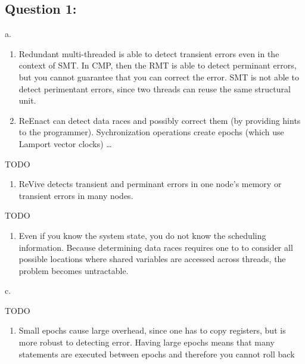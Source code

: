 \subsection{Question 1:}

a.

\begin{enumerate}
\def\labelenumi{\arabic{enumi}.}
\item
  Redundant multi-threaded is able to detect transient errors even in
  the context of SMT. In CMP, then the RMT is able to detect perminant
  errors, but you cannot guarantee that you can correct the error. SMT
  is not able to detect perimentant errors, since two threads can reuse
  the same structural unit.
\item
  ReEnact can detect data races and possibly correct them (by providing
  hints to the programmer). Sychronization operations create epochs
  (which use Lamport vector clocks) \ldots{}
\end{enumerate}

TODO

\begin{enumerate}
\def\labelenumi{\arabic{enumi}.}
\setcounter{enumi}{2}
\itemsep1pt\parskip0pt
\item
  ReVive detects transient and perminant errors in one node's memory or
  transient errors in many nodes.
\end{enumerate}

TODO

\begin{enumerate}
\def\labelenumi{\alph{enumi}.}
\setcounter{enumi}{1}
\itemsep1pt\parskip0pt
\item
  Even if you know the system state, you do not know the scheduling
  information. Because determining data races requires one to to
  consider all possible locations where shared variables are accessed
  across threads, the problem becomes untractable.
\end{enumerate}

c.

TODO

\begin{enumerate}
\def\labelenumi{\alph{enumi}.}
\setcounter{enumi}{3}
\itemsep1pt\parskip0pt
\item
  Small epochs cause large overhead, since one has to copy registers,
  but is more robust to detecting error. Having large epochs means that
  many statements are executed between epochs and therefore you cannot
  roll back
\end{enumerate}

